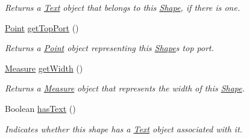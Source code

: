 \begin{DoxyCompactItemize}
\begin{DoxyCompactList}\small\item\em Returns a \hyperlink{classcom_1_1aarrelaakso_1_1drawl_1_1_text}{Text} object that belongs to this \hyperlink{classcom_1_1aarrelaakso_1_1drawl_1_1_shape}{Shape}, if there is one. \end{DoxyCompactList}\item 
\hyperlink{classcom_1_1aarrelaakso_1_1drawl_1_1_point}{Point} \hyperlink{classcom_1_1aarrelaakso_1_1drawl_1_1_shape_aed4e9caa294aacc973b7a531a960e9e5}{get\+Top\+Port} ()
\begin{DoxyCompactList}\small\item\em Returns a \hyperlink{classcom_1_1aarrelaakso_1_1drawl_1_1_point}{Point} object representing this \hyperlink{classcom_1_1aarrelaakso_1_1drawl_1_1_shape}{Shape}\textquotesingle{}s top port. \end{DoxyCompactList}\item 
\hyperlink{classcom_1_1aarrelaakso_1_1drawl_1_1_measure}{Measure} \hyperlink{classcom_1_1aarrelaakso_1_1drawl_1_1_shape_a3e2c58984f1bcbc2e9e86cf30868561e}{get\+Width} ()
\begin{DoxyCompactList}\small\item\em Returns a \hyperlink{classcom_1_1aarrelaakso_1_1drawl_1_1_measure}{Measure} object that represents the width of this \hyperlink{classcom_1_1aarrelaakso_1_1drawl_1_1_shape}{Shape}. \end{DoxyCompactList}\item 
Boolean \hyperlink{classcom_1_1aarrelaakso_1_1drawl_1_1_shape_a037a5515b2a6e1df1d1981aa5516e78e}{has\+Text} ()
\begin{DoxyCompactList}\small\item\em Indicates whether this shape has a \hyperlink{classcom_1_1aarrelaakso_1_1drawl_1_1_text}{Text} object associated with it. \end{DoxyCompactList}\end{DoxyCompactItemize}
